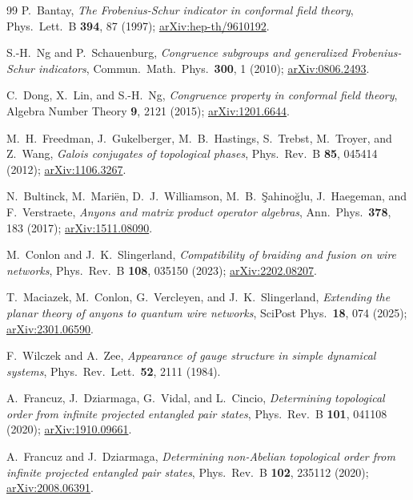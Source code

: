 \documentclass[aps,pra,twocolumn,superscriptaddress,longbibliography,floatfix,nofootinbib]{revtex4-2}
\begin{document}
\begin{thebibliography}{99}
P.~Bantay,
\emph{The Frobenius-Schur indicator in conformal field theory},
Phys.\ Lett.\ B \textbf{394}, 87 (1997);
\href{https://arxiv.org/abs/hep-th/9610192}{arXiv:hep-th/9610192}.

S.-H.~Ng and P.~Schauenburg,
\emph{Congruence subgroups and generalized Frobenius-Schur indicators},
Commun.\ Math.\ Phys.\ \textbf{300}, 1 (2010);
\href{https://arxiv.org/abs/0806.2493}{arXiv:0806.2493}.

C.~Dong, X.~Lin, and S.-H.~Ng,
\emph{Congruence property in conformal field theory},
Algebra Number Theory \textbf{9}, 2121 (2015);
\href{https://arxiv.org/abs/1201.6644}{arXiv:1201.6644}.

M.~H.~Freedman, J.~Gukelberger, M.~B.~Hastings, S.~Trebst,
M.~Troyer, and Z.~Wang,
\emph{Galois conjugates of topological phases},
Phys.\ Rev.\ B \textbf{85}, 045414 (2012);
\href{https://arxiv.org/abs/1106.3267}{arXiv:1106.3267}.

N.~Bultinck, M.~Mari\"en, D.~J.~Williamson, M.~B.~\c{S}ahino\u{g}lu,
J.~Haegeman, and F.~Verstraete,
\emph{Anyons and matrix product operator algebras},
Ann.\ Phys.\ \textbf{378}, 183 (2017);
\href{https://arxiv.org/abs/1511.08090}{arXiv:1511.08090}.

M.~Conlon and J.~K.~Slingerland,
\emph{Compatibility of braiding and fusion on wire networks},
Phys.\ Rev.\ B \textbf{108}, 035150 (2023);
\href{https://arxiv.org/abs/2202.08207}{arXiv:2202.08207}.

T.~Maciazek, M.~Conlon, G.~Vercleyen, and J.~K.~Slingerland,
\emph{Extending the planar theory of anyons to quantum wire networks},
SciPost Phys.\ \textbf{18}, 074 (2025);
\href{https://arxiv.org/abs/2301.06590}{arXiv:2301.06590}.

F.~Wilczek and A.~Zee,
\emph{Appearance of gauge structure in simple dynamical systems},
Phys.\ Rev.\ Lett.\ \textbf{52}, 2111 (1984).

A.~Francuz, J.~Dziarmaga, G.~Vidal, and L.~Cincio,
\emph{Determining topological order from infinite projected entangled pair
states},
Phys.\ Rev.\ B \textbf{101}, 041108 (2020);
\href{https://arxiv.org/abs/1910.09661}{arXiv:1910.09661}.

A.~Francuz and J.~Dziarmaga,
\emph{Determining non-Abelian topological order from infinite projected
entangled pair states},
Phys.\ Rev.\ B \textbf{102}, 235112 (2020);
\href{https://arxiv.org/abs/2008.06391}{arXiv:2008.06391}.


\end{thebibliography}
\end{document}
